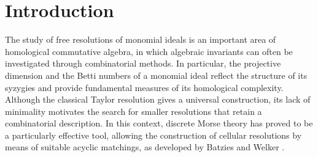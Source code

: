 \documentclass[reqno]{amsart}
\DeclareMathOperator{\lcm}{lcm}
\DeclareMathOperator{\mingens}{Mingens}
\theoremstyle{definition}
\theoremstyle{remark}
\numberwithin{equation}{section}
\begin{document}




\section{Introduction}

The study of free resolutions of monomial ideals is an important area of homological commutative algebra, in which algebraic invariants can often be investigated through combinatorial methods. In particular, the projective dimension and the Betti numbers of a monomial ideal reflect the structure of its syzygies and provide fundamental measures of its homological complexity. Although the classical Taylor resolution \cite{T} gives a universal construction, its lack of minimality motivates the search for smaller resolutions that retain a combinatorial description. In this context, discrete Morse theory has proved to be a particularly effective tool, allowing the construction of cellular resolutions by means of suitable acyclic matchings, as developed by Batzies and Welker \cite{BW02}.
\end{document}
